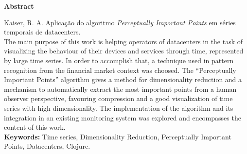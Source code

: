 \begin{titlepage}
\begin{center}
  \Large
  \textbf{Abstract}
\end{center}
Kaiser, R. A. Aplicação do algoritmo \textit{Perceptually Important Points} em séries temporais de datacenters.\\

The main purpose of this work is helping operators of datacenters in the task of visualizing the behaviour of their devices and services through time, represented by large time series. In order to accomplish that, a technique used in pattern recognition from the financial market context was choosed. The ``Perceptually Important Points'' algorithm gives a method for dimensionality reduction and a mechanism to automatically extract the most important points from a human observer perspective, favouring compression and a good visualization of time series with high dimensionality. The implementation of the algorithm and its integration in an existing monitoring system was explored and encompasses the content of this work.\\

\textbf{Keywords:} Time series, Dimensionality Reduction, Perceptually Important Points, Datacenters, Clojure.

\end{titlepage}
